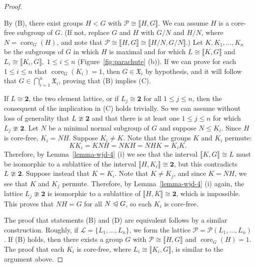 \documentclass{gen-j-l}
\newcommand{\lb}{\ensuremath{\llbracket}}
\newcommand{\rb}{\ensuremath{\rrbracket}}
\newcommand{\<}{\ensuremath{\langle}}
\renewcommand{\>}{\ensuremath{\rangle}}
\theoremstyle{plain}
\theoremstyle{definition}
\theoremstyle{remark}
\numberwithin{theorem}{section}
\numberwithin{claim}{section}
\numberwithin{equation}{section}
\numberwithin{conjecture}{section}
\renewcommand{\leq}{\ensuremath{\leqslant}}
\newcommand{\subnormal}{\ensuremath{\trianglelefteqslant}}
\newcommand{\core}{\ensuremath{\operatorname{core}}}
\newcommand{\2}{\ensuremath{\mathbf{2}}}
\newcommand{\3}{\ensuremath{\mathbf{3}}}
\newcommand{\sG}{\ensuremath{\mathfrak{X}}}
\newcommand{\sL}{\ensuremath{\mathscr{L}}}
\newcommand{\sP}{\ensuremath{\mathscr{P}}}
\begin{document}
\begin{proof}
\begin{figure}[centering]
\begin{center}
{
}
\end{center}
\end{figure}
By (B), there exist groups $H <G$ with $\sP \cong \lb H,G \rb$.  We can assume $H$
is a core-free subgroup of $G$.  (If not, replace $G$ and $H$ with
$G/N$ and $H/N$, where $N=\core_G(H)$, and note that 
$\sP \cong \lb H,G \rb \cong \lb H/N,G/N \rb$.)
Let $K, K_1, \dots, K_n$ be the subgroups of $G$ in which $H$ is maximal
and for which
$L \cong \lb K, G \rb$ and $L_i \cong \lb K_i, G \rb,\; 1\leq i\leq n$ (Figure~\ref{fig:parachute} (b)).
If we can prove for each $1\leq i\leq n$ that $\core_G(K_i)=1$, then $G\in
\sG_i$ by hypothesis, and it will follow that $G \in \bigcap\limits_{i=1}^n
\sG_i$, proving that (B) implies (C). 

If $L \cong \2$, the two element lattice, or if $L_j\cong \2$ for all $1\leq
j\leq n$, then the consequent of the implication in (C) holds trivially.
So we can assume without loss of
generality that $L\ncong \2$ and that there is at least one $1\leq j\leq n$ for which
$L_j\ncong \2$. Let $N$ be a minimal normal subgroup of $G$ and suppose $N\leq
K_i$.  Since $H$ is core-free, $K_i = NH$.  
Suppose $K_i \neq K$.
Note that the groups $K$ and $K_i$ permute:
\[
K K_i = K NH = NKH = NHK = K_i K.
\]
Therefore, by Lemma~\ref{lemma-wjd-4} (i) we see that the interval $\lb K,G \rb \cong L$
must be isomorphic to a sublattice of the interval $\lb H,K_i\rb \cong \2$, but this
contradicts $L\ncong \2$.
Suppose instead that $K = K_i$. Note that $K \neq K_j$, and since $K=NH$, we
see that $K$ and $K_j$ permute.  Therefore, by Lemma~\ref{lemma-wjd-4} (i)
again, the lattice $L_j\ncong \2$ is isomorphic to a sublattice of $\lb H,K \rb\cong
\2$, which is impossible.  This proves that $NH = G$ for all $N\subnormal G$, so
each $K_i$ is core-free. 

The proof that statements (B) and (D) are equivalent follows by a similar
construction.  Roughly, if
$\sL = \{L_1, \dots, L_n\}$, we form  the lattice $\sP = \sP(L_1, \dots, L_n)$.
If (B) holds, then there exists a group $G$ with $\sP \cong \lb H, G \rb$ and
$\core_G(H)=1$.  The proof that each $K_i$ is core-free, where $L_i\cong \lb K_i,G \rb$, is
similar to the argument above.
\end{proof}
\end{document}
